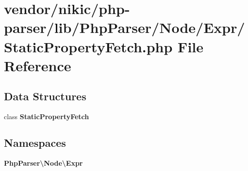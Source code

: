 \section{vendor/nikic/php-\/parser/lib/\+Php\+Parser/\+Node/\+Expr/\+Static\+Property\+Fetch.php File Reference}
\label{_static_property_fetch_8php}
\subsection*{Data Structures}
\begin{DoxyCompactItemize}
\item 
class {\bf Static\+Property\+Fetch}
\end{DoxyCompactItemize}
\subsection*{Namespaces}
\begin{DoxyCompactItemize}
\item 
 {\bf Php\+Parser\textbackslash{}\+Node\textbackslash{}\+Expr}
\end{DoxyCompactItemize}
